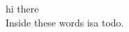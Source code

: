 \documentclass{article}
\begin{document}
\noindent
hi there \\
 Inside these words isa todo.
\newpage
\listtodos
\end{document}
